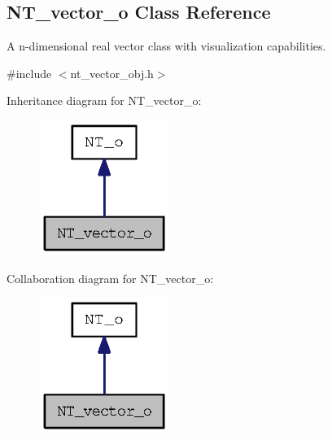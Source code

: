 \subsection{NT\_\-vector\_\-o Class Reference}
\label{class_n_t__vector__o}


A n-\/dimensional real vector class with visualization capabilities.  




{\ttfamily \#include $<$nt\_\-vector\_\-obj.h$>$}



Inheritance diagram for NT\_\-vector\_\-o:
\nopagebreak
\begin{figure}[H]
\begin{center}
\leavevmode
\includegraphics[width=120pt]{class_n_t__vector__o__inherit__graph}
\end{center}
\end{figure}


Collaboration diagram for NT\_\-vector\_\-o:
\nopagebreak
\begin{figure}[H]
\begin{center}
\leavevmode
\includegraphics[width=120pt]{class_n_t__vector__o__coll__graph}
\end{center}
\end{figure}
